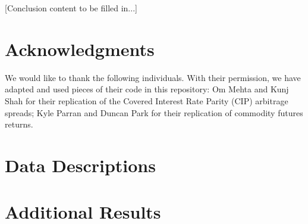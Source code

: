 \documentclass{article}
\begin{document}

[Conclusion content to be filled in...]

\section*{Acknowledgments}

We would like to thank the following individuals. With their permission, we have adapted and used pieces of their code in this repository: Om Mehta and Kunj Shah for their replication of the Covered Interest Rate Parity (CIP) arbitrage spreads; Kyle Parran and Duncan Park for their replication of commodity futures returns.


\appendix

\section{Data Descriptions}
\label{app:data_descriptions}

\section{Additional Results}
\label{app:additional_results}



\end{document}
